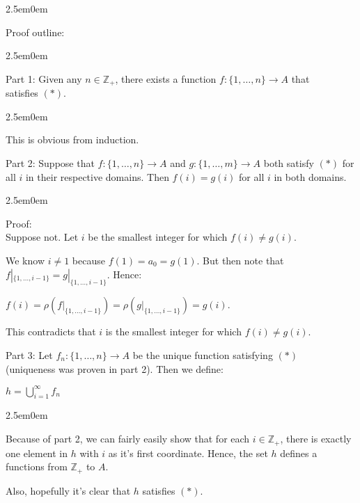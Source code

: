 \documentclass{book}
\newcommand{\hTwo}{%
\color{Black}%
   \fontsize{13}{15}\selectfont%
}
\newcommand{\hThree}{%
   \color{Black}%
   \fontsize{12}{14}\selectfont%
}
\newcommand{\myComment}{%
   \color{RawerSienna}%
   \fontsize{12}{14}\selectfont%
}
\newenvironment{myIndent}{%
   \begin{adjustwidth}{2.5em}{0em}%
}{%
   \end{adjustwidth}%
}
\newcommand{\retTwo}{\hfill\bigbreak}
\begin{document}
   \newpage
   \begin{myIndent}\hTwo
      Proof outline:

     \begin{myIndent}\hThree
       Part 1: Given any $n \in \mathbb{Z}_+$, there exists a function $f: \{1, \ldots, n\} \longrightarrow A$ that\\ satisfies $(*)$.
 
       \begin{myIndent}\myComment
          This is obvious from induction.\\ [9pt]
       \end{myIndent}

       Part 2: Suppose that $f: \{1, \ldots, n\} \longrightarrow A$ and $g: \{1, \ldots, m\} \longrightarrow A$ both satisfy $(*)$ for all $i$ in their respective domains. Then $f(i) = g(i)$ for all $i$ in both domains.

      \begin{myIndent}
         Proof:\\
         Suppose not. Let $i$ be the smallest integer for which $f(i) \neq g(i)$.\retTwo
         
         We know $i \neq 1$ because $f(1) = a_0 = g(1)$. But then note that\\ $f|_{\{1, \ldots, i - 1\}} = g|_{\{1, \ldots, i- 1\}}$. Hence:
         
         {\centering $f(i) = \rho(f|_{\{1, \ldots, i - 1\}}) = \rho(g|_{\{1, \ldots, i - 1\}}) = g(i)$.\retTwo\par}

         This contradicts that $i$ is the smallest integer for which $f(i) \neq g(i)$.\\ [9pt]
      \end{myIndent}

      Part 3: Let $f_n: \{1, \ldots, n\} \longrightarrow A$ be the unique function satisfying  $(*)$\\ (uniqueness was proven in part 2). Then we define:

      {\centering $h = \bigcup\limits_{i = 1}^\infty f_n$ \retTwo\par}

      \begin{myIndent}\myComment
         Because of part 2, we can fairly easily show that for each $i \in \mathbb{Z}_+$, there is exactly one element in $h$ with $i$ as it's first coordinate. Hence, the set $h$ defines a functions from $\mathbb{Z}_+$ to $A$.\retTwo

         Also, hopefully it's clear that $h$ satisfies $(*)$.\retTwo
      \end{myIndent}
     \end{myIndent}
   \end{myIndent}
\end{document}
